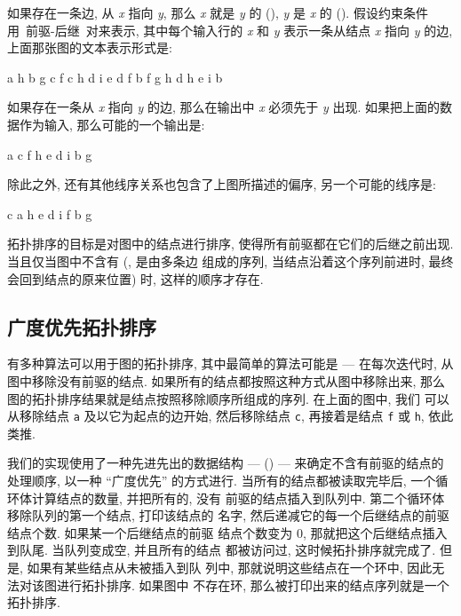 如果存在一条边, 从 \textit{x} 指向 \textit{y}, 那么 \textit{x} 就是
\textit{y} 的  (), \textit{y} 是 \textit{x}
的  (). 假设约束条件用\ \mbox{前驱}-后继\
对来表示,
其中每个输入行的 \textit{x} 和 \textit{y} 表示一条从结点 \textit{x} 指向 
\textit{y} 的边, 上面那张图的文本表示形式是:
\begin{file}
    a   h
    b   g
    c   f
    c   h
    d   i
    e   d
    f   b
    f   g
    h   d
    h   e
    i   b
\end{file}

如果存在一条从 \textit{x} 指向 \textit{y} 的边, 那么在输出中 \textit{x}
必须先于 \textit{y} 出现. 如果把上面的数据作为输入, 那么可能的一个输出是:
\begin{file}
    a c f h e d i b g
\end{file}
除此之外, 还有其他线序关系也包含了上图所描述的偏序, 另一个可能的线序是:
\begin{file}
    c a h e d i f b g
\end{file}

拓扑排序的目标是对图中的结点进行排序, 使得所有前驱都在它们的后继之前出现.
 当且仅当图中不含有  (, 是由多条边
组成的序列, 当结点沿着这个序列前进时, 最终会回到结点的原来位置) 时, 
这样的顺序才存在.

\subsection{广度优先拓扑排序}
\label{subsec:breadth_first_topological_sort}

有多种算法可以用于图的拓扑排序, 其中最简单的算法可能是 --- 在每次迭代时,
从图中移除没有前驱的结点. 如果所有的结点都按照这种方式从图中移除出来,
那么图的拓扑排序结果就是结点按照移除顺序所组成的序列. 在上面的图中, 我们 
可以从移除结点 \texttt{a} 及以它为起点的边开始, 然后移除结点 \texttt{c},
再接着是结点 \texttt{f} 或 \texttt{h}, 依此类推.

我们的实现使用了一种先进先出的数据结构 ---  () ---
来确定不含有前驱的结点的处理顺序, 以一种 ``广度优先'' 的方式进行.
当所有的结点都被读取完毕后, 一个循环体计算结点的数量, 并把所有的, 没有 
前驱的结点插入到队列中. 第二个循环体移除队列的第一个结点, 打印该结点的
名字, 然后递减它的每一个后继结点的前驱结点个数. 如果某一个后继结点的前驱
结点个数变为 0, 那就把这个后继结点插入到队尾. 当队列变成空, 并且所有的结点
都被访问过, 这时候拓扑排序就完成了. 但是, 如果有某些结点从未被插入到队
列中, 那就说明这些结点在一个环中, 因此无法对该图进行拓扑排序. 如果图中
不存在环, 那么被打印出来的结点序列就是一个拓扑排序.

